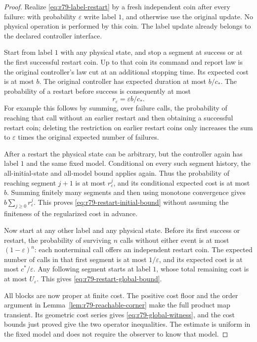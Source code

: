 \begin{proof}
Realize \eqref{eq:r79-label-restart} by a fresh independent coin
after every failure: with probability $\varepsilon$ write label
$1$, and otherwise use the original update.  No physical operation
is performed by this coin.  The label update already belongs to
the declared controller interface.

Start from label $1$ with any physical state, and stop a segment
at success or at the first successful restart coin.  Up to that
coin its command and report law is the original controller's law
cut at an additional stopping time.  Its expected cost is at most
$b$.  The original controller has expected duration at most
$b/c_*$.  The probability of a restart before success is consequently
at most
\[
 r_\varepsilon=\varepsilon b/c_*.
\]
For example this follows by summing, over failure calls, the
probability of reaching that call without an earlier restart and
then obtaining a successful restart coin; deleting the restriction
on earlier restart coins only increases the sum to
$\varepsilon$ times the original expected number of failures.

After a restart the physical state can be arbitrary, but the
controller again has label $1$ and the same fixed model.  Conditional
on every such segment history, the all-initial-state and all-model
bound applies again.  Thus the probability of reaching segment
$j+1$ is at most $r_\varepsilon^j$, and its conditional expected
cost is at most $b$.  Summing finitely many segments and then using
monotone convergence gives $b\sum_{j\ge0}r_\varepsilon^j$.
This proves \eqref{eq:r79-restart-initial-bound} without assuming
the finiteness of the regularized cost in advance.

Now start at any other label and any physical state.  Before its
first success or restart, the probability of surviving $n$ calls
without either event is at most $(1-\varepsilon)^n$: each
nonterminal call offers an independent restart coin.  The expected
number of calls in that first segment is at most $1/\varepsilon$,
and its expected cost is at most $c^*/\varepsilon$.  Any following
segment starts at label $1$, whose total remaining cost is at most
$U_\varepsilon$.  This gives
\eqref{eq:r79-restart-global-bound}.

All blocks are now proper at finite cost.  The positive cost floor
and the order argument in Lemma~\ref{lem:r79-reachable-corner}
make the full product map transient.  Its geometric cost series
gives \eqref{eq:r79-global-witness}, and the cost bounds just
proved give the two operator inequalities.  The estimate is
uniform in the fixed model and does not require the observer to
know that model.
\end{proof}

